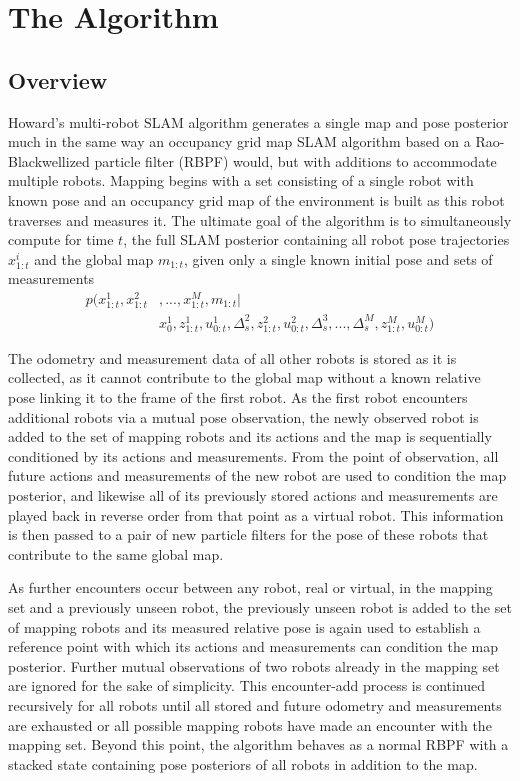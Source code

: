 \section{The Algorithm}
\label{S:Alg}

\subsection{Overview}
\label{SS:Alg:Overview} 


Howard’s multi-robot SLAM algorithm generates a single map and pose posterior much in the same way an occupancy grid map SLAM algorithm based on a Rao-Blackwellized particle filter (RBPF) would, but with additions to accommodate multiple robots. Mapping begins with a set consisting of a single robot with known pose and an occupancy grid map of the environment is built as this robot traverses and measures it. The ultimate goal of the algorithm is to simultaneously compute for time $t$, the full SLAM posterior containing all robot pose trajectories $x_{1:t}^i$ and the global map $m_{1:t}$, given only a single known initial pose and sets of measurements
\begin{align*}
p(x_{1:t}^1,x_{1:t}^2&,...,x_{1:t}^M,m_{1:t}|\\&x_0^1,z_{1:t}^1,u_{0:t}^1,\Delta_s^2,z_{1:t}^2,u_{0:t}^2,\Delta_s^3,...,\Delta_s^M,z_{1:t}^M,u_{0:t}^M)
\end{align*}

The odometry and measurement data of all other robots is stored as it is collected, as it cannot contribute to the global map without a known relative pose linking it to the frame of the first robot. As the first robot encounters additional robots via a mutual pose observation, the newly observed robot is added to the set of mapping robots and its actions and the map is sequentially conditioned by its actions and measurements. From the point of observation, all future actions and measurements of the new robot are used to condition the map posterior, and likewise all of its previously stored actions and measurements are played back in reverse order from that point as a virtual robot. This information is then passed to a pair of new particle filters for the pose of these robots that contribute to the same global map. 

As further encounters occur between any robot, real or virtual, in the mapping set and a previously unseen robot, the previously unseen robot is added to the set of mapping robots and its measured relative pose is again used to establish a reference point with which its actions and measurements can condition the map posterior. Further mutual observations of two robots already in the mapping set are ignored for the sake of simplicity. This encounter-add process is continued recursively for all robots until all stored and future odometry and measurements are exhausted or all possible mapping robots have made an encounter with the mapping set. Beyond this point, the algorithm behaves as a normal RBPF with a stacked state containing pose posteriors of all robots in addition to the map.


